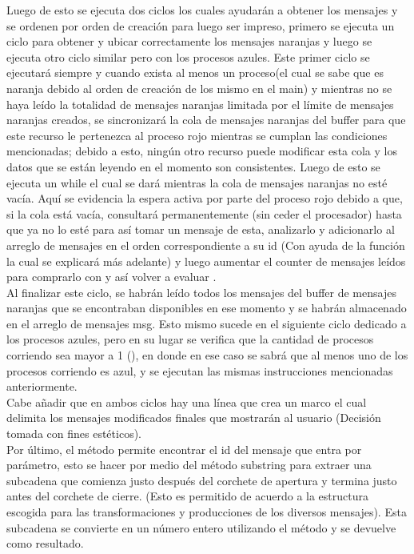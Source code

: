 \documentclass[a4paper]{article}
\begin{document}
    Luego de esto se ejecuta dos ciclos los cuales ayudar\'an a obtener los mensajes y se ordenen por orden de creaci\'on para luego ser impreso, primero se ejecuta un ciclo para obtener y ubicar correctamente los mensajes naranjas y luego se ejecuta otro ciclo similar pero con los procesos azules.
    Este primer ciclo se ejecutar\'a siempre y cuando exista al menos un proceso(el cual se sabe que es naranja debido al orden de creaci\'on de los mismo en el main) y mientras no se haya le\'ido la totalidad de mensajes naranjas limitada por el l\'imite de mensajes naranjas creados, se sincronizar\'a la cola de mensajes naranjas del buffer para que este recurso le pertenezca al proceso rojo mientras se cumplan las condiciones mencionadas; debido a esto, ning\'un otro recurso puede modificar esta cola y los datos que se est\'an leyendo en el momento son consistentes.
    Luego de esto se ejecuta un while el cual se dar\'a mientras la cola de mensajes naranjas no est\'e vac\'ia.
    Aqu\'i se evidencia la espera activa por parte del proceso rojo debido a que, si la cola est\'a vac\'ia, consultar\'a permanentemente (sin ceder el procesador) hasta que ya no lo est\'e para as\'i tomar un mensaje de esta, analizarlo y adicionarlo al arreglo de mensajes  en el orden correspondiente a su id (Con ayuda de la funci\'on  la cual se explicar\'a m\'as adelante) y luego aumentar el counter de mensajes le\'idos para comprarlo con  y as\'i volver a evaluar .\\
    Al finalizar este ciclo, se habr\'an le\'ido todos los mensajes del buffer de mensajes naranjas que se encontraban disponibles en ese momento y se habr\'an almacenado en el arreglo de mensajes msg.
    Esto mismo sucede en el siguiente ciclo dedicado a los procesos azules, pero en su lugar se verifica que la cantidad de procesos corriendo sea mayor a 1 (), en donde en ese caso se sabr\'a que al menos uno de los procesos corriendo es azul, y se ejecutan las mismas instrucciones mencionadas anteriormente.\\
    Cabe a\~nadir que en ambos ciclos hay una l\'inea que crea un marco el cual delimita los mensajes modificados finales que mostrar\'an al usuario (Decisi\'on tomada con fines est\'eticos).\\

    Por \'ultimo, el m\'etodo  permite encontrar el id del mensaje que entra por par\'ametro, esto se hacer por medio del m\'etodo substring para extraer una subcadena que comienza justo despu\'es del corchete de apertura y termina justo antes del corchete de cierre.
    (Esto es permitido de acuerdo a la estructura escogida para las transformaciones y producciones de los diversos mensajes).
    Esta subcadena se convierte en un n\'umero entero utilizando el m\'etodo  y se devuelve como resultado.\\
\end{document}
